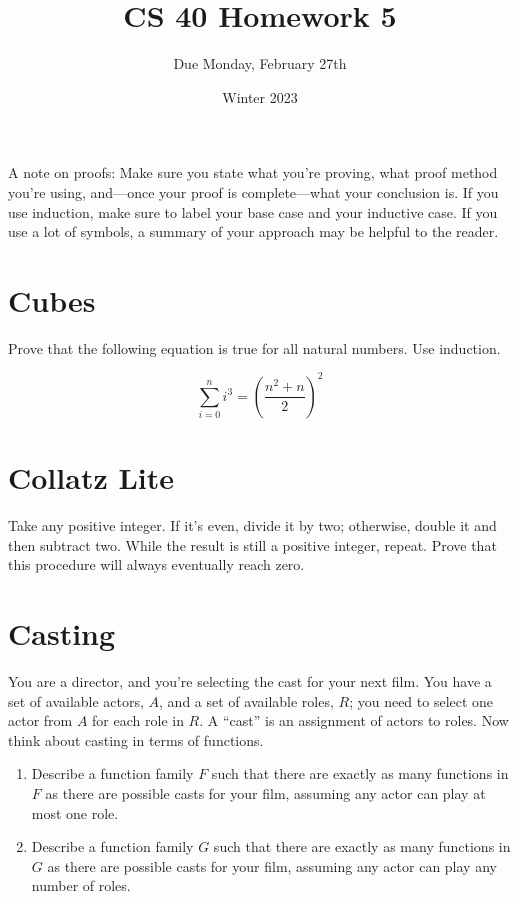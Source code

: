 \documentclass{article}
\title{CS 40 Homework 5}
\author{Due Monday, February 27th}
\date{Winter 2023}
\begin{document}
\maketitle

\noindent
A note on proofs:
Make sure you state what you're proving, what proof method you're using, and---once your proof is complete---what your conclusion is.
If you use induction, make sure to label your base case and your inductive case.
If you use a lot of symbols, a summary of your approach may be helpful to the reader.


\section{Cubes}

Prove that the following equation is true for all natural numbers.
Use induction.

$$\sum_{i=0}^n i^3 = \left(\frac{n^2 + n}{2}\right)^2$$

\section{Collatz Lite}

Take any positive integer.
If it's even, divide it by two; otherwise, double it and then subtract two.
While the result is still a positive integer, repeat.
Prove that this procedure will always eventually reach zero.


\section{Casting}

You are a director, and you're selecting the cast for your next film.
You have a set of available actors, $A$, and a set of available roles, $R$; you need to select one actor from $A$ for each role in $R$.
A ``cast'' is an assignment of actors to roles.
Now think about casting in terms of functions.

\begin{enumerate}[label=\textbf{\alph*.}]
    \item Describe a function family $F$ such that there are exactly as many functions in $F$ as there are possible casts for your film, assuming any actor can play at most one role.

    \item Describe a function family $G$ such that there are exactly as many functions in $G$ as there are possible casts for your film, assuming any actor can play any number of roles.
\end{enumerate}
\end{document}
